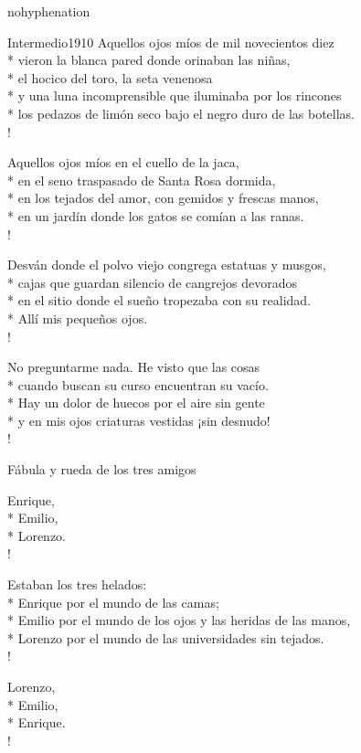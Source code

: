 \documentclass[
    a5paper,
    DIV=10,
    12pt,
    notitlepage,
    oneside,]
{scrbook} %
\begin{document}
\begin{hyphenrules}{nohyphenation}
\begin{poem}{Intermedio}{1910}{}
Aquellos ojos míos de mil novecientos diez\\*
vieron la blanca pared donde orinaban las niñas,\\*
el hocico del toro, la seta venenosa\\*
y una luna incomprensible que iluminaba por los rincones\\*
los pedazos de limón seco bajo el negro duro de las botellas.\\!

Aquellos ojos míos en el cuello de la jaca,\\*
en el seno traspasado de Santa Rosa dormida,\\*
en los tejados del amor, con gemidos y frescas manos,\\*
en un jardín donde los gatos se comían a las ranas.\\!

Desván donde el polvo viejo congrega estatuas y musgos,\\*
cajas que guardan silencio de cangrejos devorados\\*
en el sitio donde el sueño tropezaba con su realidad.\\*
Allí mis pequeños ojos.\\!

No preguntarme nada. He visto que las cosas\\*
cuando buscan su curso encuentran su vacío.\\*
Hay un dolor de huecos por el aire sin gente\\*
y en mis ojos criaturas vestidas ¡sin desnudo! \\!

\end{poem}

\begin{poem}{Fábula y rueda de los tres amigos}{}{}

Enrique,\\*
Emilio,\\*
Lorenzo.\\!

Estaban los tres helados:\\*
Enrique por el mundo de las camas;\\*
Emilio por el mundo de los ojos y las heridas de las manos,\\*
Lorenzo por el mundo de las universidades sin tejados.\\!

Lorenzo,\\*
Emilio,\\*
Enrique.\\!


\end{poem}
\end{hyphenrules}
\end{document}
